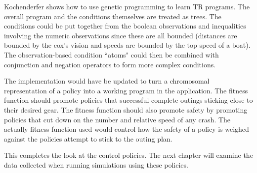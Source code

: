 Kochenderfer shows how to use genetic programming to learn TR programs. The overall program and the conditions themselves are treated as trees. The conditions could be put together from the boolean observations and inequalities involving the numeric observations since these are all bounded (distances are bounded by the cox's vision and speeds are bounded by the top speed of a boat). The observation-based condition ``atoms" could then be combined with conjunction and negation operators to form more complex conditions.

The implementation would have be updated to turn a chromosomal representation of a policy into a working program in the application. The fitness function should promote policies that successful complete outings sticking close to their desired gear. The fitness function should also promote safety by promoting policies that cut down on the number and relative speed of any crash. The actually fitness function used would control how the safety of a policy is weighed against the policies attempt to stick to the outing plan.

This completes the look at the control policies. The next chapter will examine the data collected when running simulations using these policies.